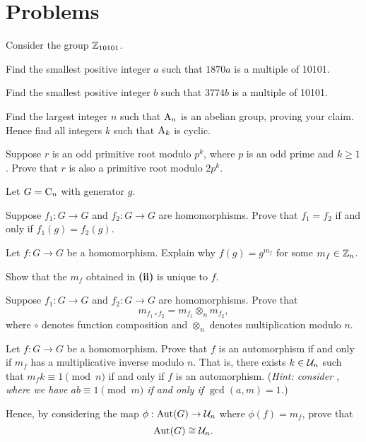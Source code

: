 \newpage

\section{Problems}
\begin{problem}
    Consider the group $\mathbb{Z}_{10101}$.
    \begin{partquestions}{\alph*}
        \item Find the smallest positive integer $a$ such that $1870a$ is a multiple of 10101.
        \item Find the smallest positive integer $b$ such that $3774b$ is a multiple of 10101.
    \end{partquestions}
\end{problem}

\begin{problem}
    Find the largest integer $n$ such that $\mathrm{A}_{n}$ is an abelian group, proving your claim. Hence find all integers $k$ such that $\mathrm{A}_{k}$ is cyclic.
\end{problem}

\begin{problem}
    Suppose $r$ is an odd primitive root modulo $p^k$, where $p$ is an odd prime and $k \geq 1$. Prove that $r$ is also a primitive root modulo $2p^k$.
\end{problem}

\begin{problem}
    Let $G = \mathrm{C}_{n}$ with generator $g$.
    \begin{partquestions}{\roman*}
        \item Suppose $f_1: G \to G$ and $f_2: G \to G$ are homomorphisms. Prove that $f_1 = f_2$ if and only if $f_1(g) = f_2(g)$.

        \item Let $f: G \to G$ be a homomorphism. Explain why $f(g) = g^{m_f}$ for some $m_f \in \mathbb{Z}_n$.

        \item Show that the $m_f$ obtained in \textbf{(ii)} is unique to $f$.

        \item Suppose $f_1: G \to G$ and $f_2: G \to G$ are homomorphisms. Prove that
        \[
            m_{f_1\circ f_2} = m_{f_1} \otimes_n m_{f_2},
        \]
        where $\circ$ denotes function composition and $\otimes_n$ denotes multiplication modulo $n$.

        \item Let $f: G \to G$ be a homomorphism. Prove that $f$ is an automorphism if and only if $m_f$ has a multiplicative inverse modulo $n$. That is, there exists $k \in \mathcal{U}_{n}$ such that $m_fk \equiv 1 \pmod n$ if and only if $f$ is an automorphism.\newline
        (\textit{Hint: consider , where we have $ab \equiv 1 \pmod m$ if and only if $\gcd(a, m) = 1$.})

        \item Hence, by considering the map $\phi: \mathrm{Aut}(G) \to \mathcal{U}_{n}$ where $\phi(f) = m_f$, prove that
        \[
            \mathrm{Aut}(G) \cong \mathcal{U}_{n}.
        \]
    \end{partquestions}
\end{problem}
